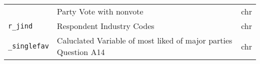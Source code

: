 \documentclass[]{article}
\begin{document}
\begin{longtable}[]{@{}lll@{}}
\begin{minipage}[t]{0.14\columnwidth}
\end{minipage} & \begin{minipage}[t]{0.70\columnwidth}\raggedright\strut
Party Vote with nonvote\strut
\end{minipage} & \begin{minipage}[t]{0.08\columnwidth}\raggedright\strut
chr\strut
\end{minipage}\tabularnewline
\begin{minipage}[t]{0.14\columnwidth}\raggedright\strut
\texttt{r\_jind}\strut
\end{minipage} & \begin{minipage}[t]{0.70\columnwidth}\raggedright\strut
Respondent Industry Codes\strut
\end{minipage} & \begin{minipage}[t]{0.08\columnwidth}\raggedright\strut
chr\strut
\end{minipage}\tabularnewline
\begin{minipage}[t]{0.14\columnwidth}\raggedright\strut
\texttt{\_singlefav}\strut
\end{minipage} & \begin{minipage}[t]{0.70\columnwidth}\raggedright\strut
Caluclated Variable of most liked of major parties Question A14\strut
\end{minipage} & \begin{minipage}[t]{0.08\columnwidth}\raggedright\strut
chr\strut
\end{minipage}\tabularnewline
\bottomrule
\end{longtable}
\end{document}
